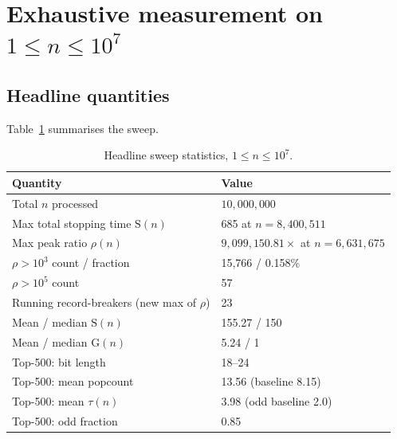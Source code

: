\documentclass[11pt]{article}
\theoremstyle{remark}
\begin{document}
\section{Exhaustive measurement on \texorpdfstring{$1 \le n \le 10^{7}$}{1 <= n <= 10 million}}
\label{sec:empirical}

\subsection{Headline quantities}
Table~\ref{tab:headline} summarises the sweep.

\begin{table}[t]
\centering
\begin{tabular}{@{}ll@{}}
\toprule
Quantity & Value \\
\midrule
Total $n$ processed & $10{,}000{,}000$ \\
Max total stopping time $\mathrm{S}(n)$ & 685 at $n = 8{,}400{,}511$ \\
Max peak ratio $\rho(n)$ & $9{,}099{,}150.81\times$ at $n = 6{,}631{,}675$ \\
$\rho > 10^3$ count / fraction & 15{,}766 / 0.158\% \\
$\rho > 10^5$ count & 57 \\
Running record-breakers (new max of $\rho$) & 23 \\
Mean / median $\mathrm{S}(n)$ & 155.27 / 150 \\
Mean / median $\mathrm{G}(n)$ & 5.24 / 1 \\
Top-500: bit length & 18--24 \\
Top-500: mean popcount & 13.56 (baseline 8.15) \\
Top-500: mean $\tau(n)$ & 3.98 (odd baseline 2.0) \\
Top-500: odd fraction & 0.85 \\
\bottomrule
\end{tabular}
\caption{Headline sweep statistics, $1 \le n \le 10^7$.}
\label{tab:headline}
\end{table}
\end{document}
